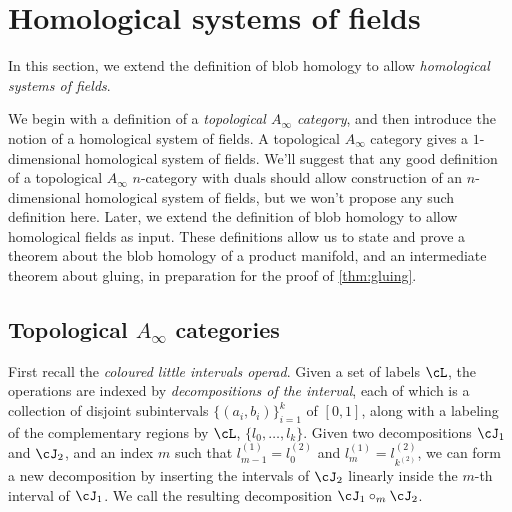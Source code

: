 \section{Homological systems of fields}

In this section, we extend the definition of blob homology to allow \emph{homological systems of fields}.

We begin with a definition of a \emph{topological $A_\infty$ category}, and then introduce the notion of a homological system of fields. A topological $A_\infty$ category gives a $1$-dimensional homological system of fields. We'll suggest that any good definition of a topological $A_\infty$ $n$-category with duals should allow construction of an $n$-dimensional homological system of fields, but we won't propose any such definition here. Later, we extend the definition of blob homology to allow homological fields as input. These definitions allow us to state and prove a theorem about the blob homology of a product manifold, and an intermediate theorem about gluing, in preparation for the proof of \ref{thm:gluing}.

\subsection{Topological $A_\infty$ categories}

First recall the \emph{coloured little intervals operad}. Given a set of labels $\cL$, the operations are indexed by \emph{decompositions of the interval}, each of which is a collection of disjoint subintervals $\{(a_i,b_i)\}_{i=1}^k$ of $[0,1]$, along with a labeling of the complementary regions by $\cL$, $\{l_0, \ldots, l_k\}$.  Given two decompositions $\cJ_1$ and $\cJ_2$, and an index $m$ such that $l^{(1)}_{m-1} = l^{(2)}_0$ and $l^{(1)}_{m} = l^{(2)}_{k^{(2)}}$, we can form a new decomposition by inserting the intervals of $\cJ_2$ linearly inside the $m$-th interval of $\cJ_1$. We call the resulting decomposition $\cJ_1 \circ_m \cJ_2$.

